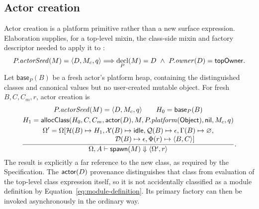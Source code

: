 \subsection{Actor creation}

Actor creation is a platform primitive rather than a new surface expression.
Elaboration supplies, for a top-level mixin, the class-side mixin and factory
descriptor needed to apply it to \Object:
\begin{equation}\label{eq:actor-seed}
 P.\mathit{actorSeed}(M)=\langle D,M_c,q\rangle
 \Longrightarrow
 \mathop{\mathrm{decl}}_P(M)=D\ \land\ P.\mathit{owner}(D)=\mathsf{topOwner}.
\end{equation}
Let $\mathsf{base}_P(B)$ be a fresh actor's platform heap, containing the
distinguished classes and canonical values but no user-created mutable object.
For fresh $B,C,C_m,r$, actor creation is
{\small
\begin{equation}\label{eq:create-actor}
\dfrac{\begin{gathered}
 P.\mathit{actorSeed}(M)=\langle D,M_c,q\rangle\qquad
 H_0=\mathsf{base}_P(B)\\
 H_1=\mathsf{allocClass}(H_0,C,C_m,\kw{actor}(D),M,
          P.\mathit{platform}(\kw{Object}),\nil,M_c,q)\\
 \Omega'=\Omega[\mathcal H(B)\mapsto H_1,
   \mathcal X(B)\mapsto\kw{idle},\mathcal Q(B)\mapsto\epsilon,
   \Gamma(B)\mapsto\varnothing,\\[-1mm]
 \hspace{27mm}\mathcal D(B)\mapsto\epsilon,
   \Phi(r)\mapsto\langle B,C\rangle]
\end{gathered}}
 {\Omega,A\vdash\mathsf{spawn}(M)\Downarrow\langle\Omega',r\rangle}.
\end{equation}}
The result is explicitly a far reference to the new class, as required by the
Specification.  The $\mathsf{actor}(D)$ provenance distinguishes that class from
evaluation of the top-level class expression itself, so it is not accidentally
classified as a module definition by Equation~\eqref{eq:module-definition}.
Its primary factory can then be invoked asynchronously in the ordinary way.
